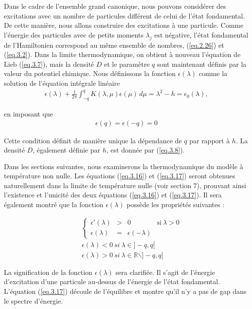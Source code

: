 Dans le cadre de l'ensemble grand canonique, nous pouvons considérer des excitations avec un nombre de particules différent de celui de l'état fondamental. De cette manière, nous allons construire des excitations à une particule. Comme l'énergie des particules avec de petits moments \( \lambda_j \) est négative, l'état fondamental de l'Hamiltonien correspond au même ensemble de nombres, (\ref{eq.2.26}) et (\ref{eq.3.2}). Dans la limite thermodynamique, on obtient à nouveau l'équation de Lieb (\ref{eq.3.7}), mais la densité \( D \) et le paramètre \( q \) sont maintenant définis par la valeur du potentiel chimique. Nous définissons la fonction \( \epsilon(\lambda) \) comme la solution de l'équation intégrale linéaire
\begin{eqnarray}
	\epsilon(\lambda) + \frac{1}{2 \pi} \int_{-q}^{q} K(\lambda, \mu) \epsilon(\mu) \, d\mu =  \lambda^2-h = \epsilon_0(\lambda)  , 	
\end{eqnarray}

en imposant que
\begin{eqnarray}
	\epsilon(q) = \epsilon(-q) = 0 		
\end{eqnarray}


Cette condition définit de manière unique la dépendance de \( q \) par rapport à \( h \). La densité \( D \), également définie par \( h \), est donnée par (\ref{eq.3.8}).

Dans les sections suivantes, nous examinerons la thermodynamique du modèle à température non nulle. Les équations (\ref{eq.3.16}) et (\ref{eq.3.17}) seront obtenues naturellement dans la limite de température nulle (voir section 7), prouvant ainsi l'existence et l'unicité des deux équations (\ref{eq.3.16}) et (\ref{eq.3.17}). Il sera également montré que la fonction \( \epsilon(\lambda) \) possède les propriétés suivantes :

\begin{eqnarray}
	&&\left \{ \begin{array}{rclr} \epsilon'(\lambda) & > & 0 & \mbox{si} ~\lambda > 0 \\ \epsilon(\lambda ) & = & \epsilon(-\lambda ) \end{array} \right .\\
	&&\epsilon ( \lambda ) < 0 ~ si ~ \lambda \in ] - q , q [ \\
	&&\epsilon ( \lambda ) > 0 ~ si ~ \lambda \in  \mathbb{R} \backslash ] - q , q [ 	
\end{eqnarray}

La signification de la fonction \( \epsilon(\lambda) \) sera clarifiée. Il s'agit de l'énergie d'excitation d'une particule au-dessus de l'énergie de l'état fondamental. L'équation (\ref{eq.3.17}) découle de l'équilibre et montre qu'il n'y a pas de gap dans le spectre d'énergie.

